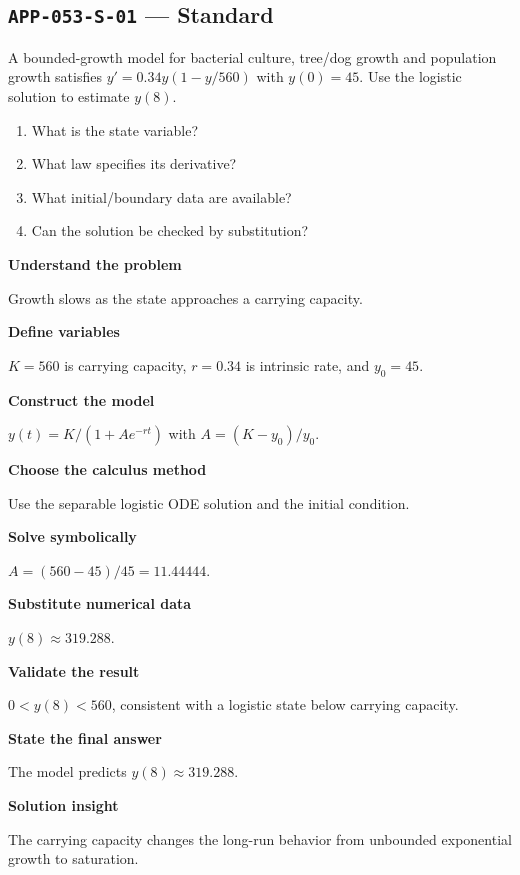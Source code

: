 \documentclass[11pt]{book}
\newcommand{\pid}[1]{\texttt{#1}}
\begin{document}
\subsection*{\pid{APP-053-S-01} — Standard}
\begin{problembox}
A bounded-growth model for bacterial culture, tree/dog growth and population growth satisfies $y'=0.34y(1-y/560)$ with $y(0)=45$. Use the logistic solution to estimate $y(8)$.
\end{problembox}
\begin{promptbox}\begin{enumerate}
\item What is the state variable?
\item What law specifies its derivative?
\item What initial/boundary data are available?
\item Can the solution be checked by substitution?
\end{enumerate}\end{promptbox}
\begin{solutionbox}
\textbf{Understand the problem}\par Growth slows as the state approaches a carrying capacity.\par\medskip
\textbf{Define variables}\par $K=560$ is carrying capacity, $r=0.34$ is intrinsic rate, and $y_0=45$.\par\medskip
\textbf{Construct the model}\par $y(t)=K/(1+A e^{-rt})$ with $A=(K-y_0)/y_0$.\par\medskip
\textbf{Choose the calculus method}\par Use the separable logistic ODE solution and the initial condition.\par\medskip
\textbf{Solve symbolically}\par $A=(560-45)/45=11.44444$.\par\medskip
\textbf{Substitute numerical data}\par $y(8)\approx 319.288$.\par\medskip
\textbf{Validate the result}\par $0<y(8)<560$, consistent with a logistic state below carrying capacity.\par\medskip
\textbf{State the final answer}\par The model predicts $y(8)\approx 319.288$.\par\medskip
\textbf{Solution insight}\par The carrying capacity changes the long-run behavior from unbounded exponential growth to saturation.\par\medskip
\end{solutionbox}
\end{document}
